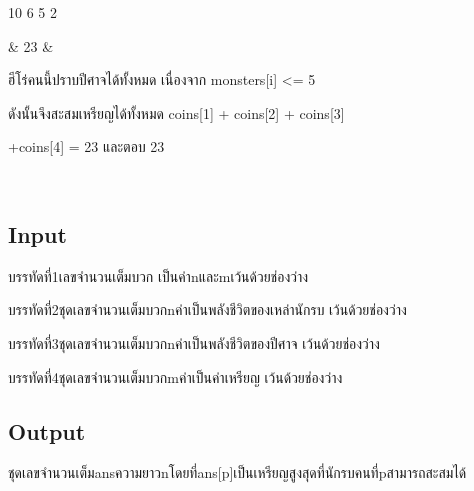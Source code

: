\documentclass{article}
\begin{document}
{\begin{longtable}[]
\begin{minipage}[t]{\linewidth}
10 6 5 2\\

\strut

\end{minipage} & 23 & \begin{minipage}[t]{\linewidth}\raggedright

ฮีโร่คนนี้ปราบปีศาจได้ทั้งหมด เนื่องจาก monsters{[}i{]} \textless= 5

ดังนั้นจึงสะสมเหรียญได้ทั้งหมด coins{[}1{]} + coins{[}2{]} + coins{[}3{]}

+coins{[}4{]} = 23 และตอบ 23\\

\strut

\end{minipage} \\

\end{longtable}

}



\subsection*{Input}
บรรทัดที่1เลขจำนวนเต็มบวก เป็นค่าnและmเว้นด้วยช่องว่าง



บรรทัดที่2ชุดเลขจำนวนเต็มบวกnค่าเป็นพลังชีวิตของเหล่านักรบ เว้นด้วยช่องว่าง



บรรทัดที่3ชุดเลขจำนวนเต็มบวกnค่าเป็นพลังชีวิตของปีศาจ เว้นด้วยช่องว่าง



บรรทัดที่4ชุดเลขจำนวนเต็มบวกmค่าเป็นค่าเหรียญ เว้นด้วยช่องว่าง



\subsection*{Output}
ชุดเลขจำนวนเต็มansความยาวnโดยที่ans{[}p{]}เป็นเหรียญสูงสุดที่นักรบคนที่pสามารถสะสมได้\\
\end{document}
